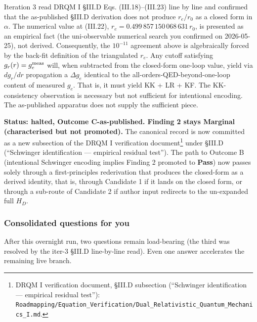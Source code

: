 \documentclass[
  11pt,
]{article}
\begin{document}
Iteration 3 read DRQM I §III.D Eqs. (III.18)--(III.23) line by line and
confirmed that the as-published §III.D derivation does not produce
\(r_e/r_0\) as a closed form in \(\alpha\). The numerical value at
(III.22), \(r_e = 0.499\,857\,150\,068\,631\,r_0\), is presented as an
empirical fact (the uni-observable numerical search you confirmed on
2026-05-25), not derived. Consequently, the \(10^{-11}\) agreement above
is algebraically forced by the back-fit definition of the triangulated
\(r_e\). Any cutoff satisfying \(g_r(r) = g_e^{\rm meas}\) will, when
subtracted from the closed-form one-loop value, yield via \(dg_r/dr\)
propagation a \(\Delta g_e\) identical to the
all-orders-QED-beyond-one-loop content of measured \(g_e\). That is, it
must yield KK + LR + KF. The KK-consistency observation is necessary but
not sufficient for intentional encoding. The as-published apparatus does
not supply the sufficient piece.

\textbf{Status: halted, Outcome C-as-published. Finding 2 stays Marginal
(characterised but not promoted).} The canonical record is now committed
as a new subsection of the DRQM I verification document\footnote{DRQM I
  verification document, §III.D subsection (``Schwinger identification
  --- empirical residual test''):
  \texttt{Roadmapping/Equation\_Verification/Dual\_Relativistic\_Quantum\_Mechanics\_I.md}.}
under §III.D (``Schwinger identification --- empirical residual test'').
The path to Outcome B (intentional Schwinger encoding implies Finding 2
promoted to \textbf{Pass}) now passes solely through a first-principles
rederivation that produces the closed-form as a derived identity, that
is, through Candidate 1 if it lands on the closed form, or through a
sub-route of Candidate 2 if author input redirects to the un-expanded
full \(H_D\).

\hypertarget{consolidated-questions-for-you}{%
\subsubsection{Consolidated questions for
you}\label{consolidated-questions-for-you}}

After this overnight run, two questions remain load-bearing (the third
was resolved by the iter-3 §III.D line-by-line read). Even one answer
accelerates the remaining live branch.
\end{document}
